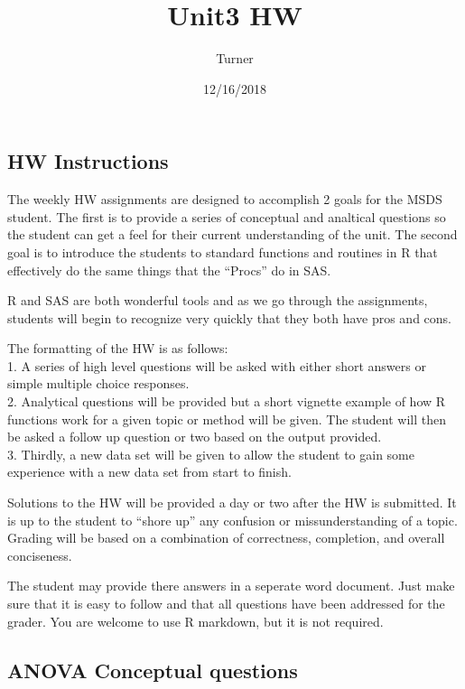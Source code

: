 \documentclass[]{article}
\title{Unit3 HW}
\author{Turner}
\date{12/16/2018}
\begin{document}
\maketitle

\hypertarget{hw-instructions}{%
\subsection{HW Instructions}\label{hw-instructions}}

The weekly HW assignments are designed to accomplish 2 goals for the
MSDS student. The first is to provide a series of conceptual and
analtical questions so the student can get a feel for their current
understanding of the unit. The second goal is to introduce the students
to standard functions and routines in R that effectively do the same
things that the ``Procs'' do in SAS.

R and SAS are both wonderful tools and as we go through the assignments,
students will begin to recognize very quickly that they both have pros
and cons.

The formatting of the HW is as follows:\\
1. A series of high level questions will be asked with either short
answers or simple multiple choice responses.\\
2. Analytical questions will be provided but a short vignette example of
how R functions work for a given topic or method will be given. The
student will then be asked a follow up question or two based on the
output provided.\\
3. Thirdly, a new data set will be given to allow the student to gain
some experience with a new data set from start to finish.

Solutions to the HW will be provided a day or two after the HW is
submitted. It is up to the student to ``shore up'' any confusion or
missunderstanding of a topic. Grading will be based on a combination of
correctness, completion, and overall conciseness.

The student may provide there answers in a seperate word document. Just
make sure that it is easy to follow and that all questions have been
addressed for the grader. You are welcome to use R markdown, but it is
not required.

\hypertarget{anova-conceptual-questions}{%
\subsection{ANOVA Conceptual
questions}\label{anova-conceptual-questions}}
\end{document}
